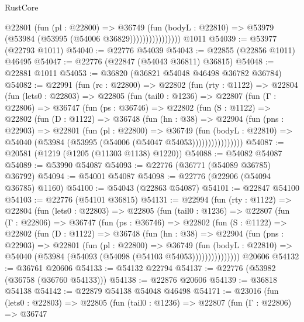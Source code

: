 \begin{lexlean}{RustCore}
\begin{coremodule}
                        @22801
                          (fun (pl : @22800) =>
                          @36749
                            (fun (bodyL : @22810) =>
                            @53979 (@53984 (@53995 (@54006 @36829))))))))))))))))
    @1011
@54039 := @53977 (@22793 @1011)
@54040 := @22776 @54039
@54043 := @22855 (@22856 @1011) @46495
@54047 := @22776 (@22847 (@54043 @36811) @36815)
@54048 := @22881 @1011
@54053 := @36820 (@36821 @54048 @46498 @36782 @36784)
@54082 := @22991
    (fun (rc : @22800) =>
    @22802
      (fun (rty : @1122) =>
      @22804
        (fun (lets0 : @22803) =>
        @22805
          (fun (tail0 : @1236) =>
          @22807
            (fun (Γ : @22806) =>
            @36747
              (fun (ps : @36746) =>
              @22802
                (fun (S : @1122) =>
                @22802
                  (fun (D : @1122) =>
                  @36748
                    (fun (hn : @38) =>
                    @22904
                      (fun (pns : @22903) =>
                      @22801
                        (fun (pl : @22800) =>
                        @36749
                          (fun (bodyL : @22810) =>
                          @54040 (@53984 (@53995 (@54006 (@54047 @54053))))))))))))))))
@54087 := @20581 (@1219 (@1205 (@11303 @1138) @1220))
@54088 := @54082 @54087
@54089 := @53990 @54087
@54093 := @22776 (@36771 (@54089 @36785) @36792)
@54094 := @54001 @54087
@54098 := @22776 (@22906 (@54094 @36785) @1160)
@54100 := @54043 (@22863 @54087)
@54101 := @22847 @54100
@54103 := @22776 (@54101 @36815)
@54131 := @22994
    (fun (rty : @1122) =>
    @22804
      (fun (lets0 : @22803) =>
      @22805
        (fun (tail0 : @1236) =>
        @22807
          (fun (Γ : @22806) =>
          @36747
            (fun (ps : @36746) =>
            @22802
              (fun (S : @1122) =>
              @22802
                (fun (D : @1122) =>
                @36748
                  (fun (hn : @38) =>
                  @22904
                    (fun (pns : @22903) =>
                    @22801
                      (fun (pl : @22800) =>
                      @36749
                        (fun (bodyL : @22810) =>
                        @54040 (@53984 (@54093 (@54098 (@54103 @54053)))))))))))))))
    @20606
@54132 := @36761 @20606
@54133 := @54132 @22794
@54137 := @22776 (@53982 (@36758 (@36760 @54133)))
@54138 := @22876 @20606
@54139 := @36818 @54138
@54142 := @22879 @54138 @54048 @46498
@54171 := @23016
    (fun (lets0 : @22803) =>
    @22805
      (fun (tail0 : @1236) =>
      @22807
        (fun (Γ : @22806) =>
        @36747

\end{coremodule}
\end{lexlean}
